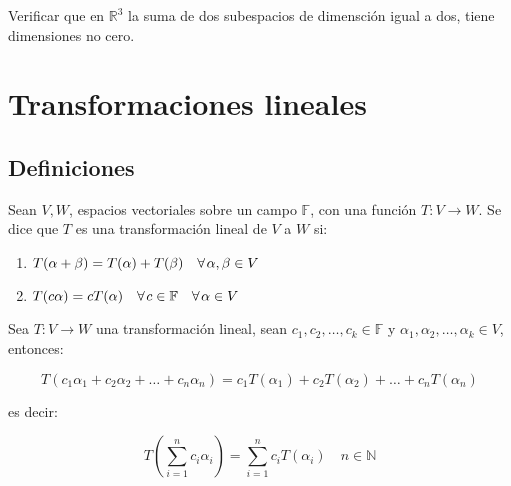 		\begin{ejercicio}
			Verificar que en $\mathbb{R}^3$ la suma de dos subespacios de dimensción igual a dos, tiene dimensiones no cero.
		\end{ejercicio}

\newpage
\section{Transformaciones lineales}

	\subsection{Definiciones}

		\begin{definicion}
			Sean $V, W$, espacios vectoriales sobre un campo $\mathbb{F}$, con una función $T \colon V \to W$.
			Se dice que $T$ es una transformación lineal de $V$ a $W$ si:

			\begin{enumerate}
				\item $T(\alpha + \beta) = T(\alpha) + T(\beta) \quad \forall \mkern2mu \alpha, \beta \in V$
				\item $T(c \alpha) = c T(\alpha) \quad \forall \mkern2mu c \in \mathbb{F} \quad \forall \mkern2mu \alpha \in V$
			\end{enumerate}
		\end{definicion}

		\begin{proposicion}
			Sea $T \colon V \to W$ una transformación lineal, sean $c_1, c_2, \dots, c_k \in \mathbb{F}$ y $\alpha_1, \alpha_2, \dots, \alpha_k \in V$, entonces:

			\begin{equation*}
				T(c_1 \alpha_1 + c_2 \alpha_2 + \dots + c_n \alpha_n) = c_1 T(\alpha_1) + c_2 T(\alpha_2) + \dots + c_n T(\alpha_n)
			\end{equation*}

			es decir:

			\begin{equation}
				T \left( \sum_{i=1}^n c_i \alpha_i \right) = \sum_{i=1}^n c_i T(\alpha_i) \quad n \in \mathbb{N}
			\end{equation}
		\end{proposicion}


